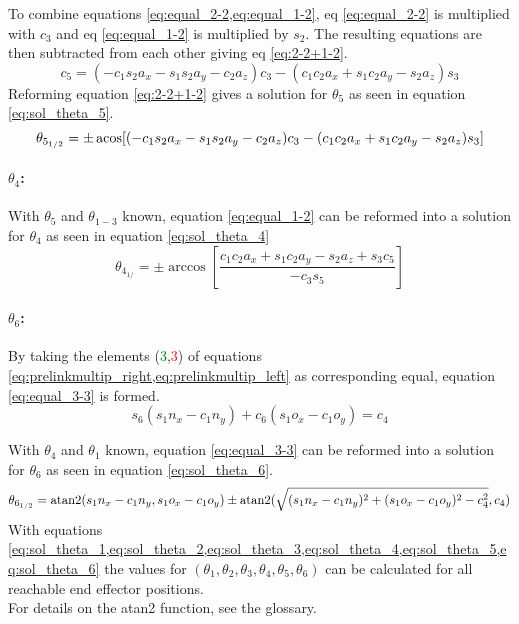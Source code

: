 To combine equations \cref{eq:equal_2-2,eq:equal_1-2}, eq \ref{eq:equal_2-2} is multiplied with $c_3$ and eq \ref{eq:equal_1-2} is multiplied by $ s_2$. The resulting equations are then subtracted from each other giving eq \ref{eq:2-2+1-2}.
\begin{equation}\label{eq:2-2+1-2}
	c_5 = (-c_1 s_2 a_x - s_1 s_2 a_y -c_2 a_z) c_3 - (c_1 c_2 a_x +s_1 c_2 a_y - s_2 a_z) s_3
\end{equation}
Reforming equation \ref{eq:2-2+1-2} gives a solution for $\theta_5$ as seen in equation \ref{eq:sol_theta_5}.
\begin{equation}\label{eq:sol_theta_5}
	\theta_{5_{1/2}} = \pm \operatorname{acos} [ ( -c_1 s_2 a_x - s_1 s_2 a_y - c_2 a_z) c_3 - (c_1 c_2 a_x + s_1 c_2 a_y - s_2 a_z) s_3]
\end{equation}

\paragraph{$\theta_4$:}

With $\theta_5$ and $\theta_{1-3}$ known, equation \ref{eq:equal_1-2} can be reformed into a solution for $\theta_4$ as seen in equation \ref{eq:sol_theta_4}
\begin{equation}\label{eq:sol_theta_4}
	\theta_{4_{1/}} = \pm \arccos [ \frac{ c_1 c_2 a_x + s_1 c_2 a_y - s_2 a_z + s_3 c_5}{-c_3 s_5}]
\end{equation}

\paragraph{$\theta_6$:}
By taking the elements (\textcolor{green}{3},\textcolor{red}{3}) of equations \cref{eq:prelinkmultip_right,eq:prelinkmultip_left} as corresponding equal, equation \ref{eq:equal_3-3} is formed.
\begin{equation} \label{eq:equal_3-3}
	s_6 (s_1 n_x - c_1 n_y) + c_6 (s_1 o_x - c_1 o_y ) = c_4
\end{equation}

With $\theta_4$ and $\theta_1$ known, equation \ref{eq:equal_3-3} can be reformed into a solution for $\theta_6$ as seen in equation \ref{eq:sol_theta_6}.
\begin{equation}\label{eq:sol_theta_6}
	\theta_{6_{1/2}} = \operatorname{atan2}(s_1 n_x -c_1 n_y , s_1 o_x -c_1 o_y) \pm \operatorname{atan2}(\sqrt{(s_1 n_x - c_1 n_y)^2 + (s_1 o_x - c_1 o_y )^2 - c_4^2} , c_4)
\end{equation}
\medskip
With equations \cref{eq:sol_theta_1,eq:sol_theta_2,eq:sol_theta_3,eq:sol_theta_4,eq:sol_theta_5,eq:sol_theta_6} the values for $(\theta_1, \theta_2, \theta_3, \theta_4, \theta_5, \theta_6)$ can be calculated for all reachable end effector positions.\\
\medskip
For details on the \gls{atan2} function, see the glossary.
\medskip


